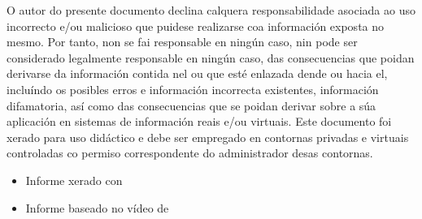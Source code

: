\documentclass[a4paper]{article}
\begin{document}
\begin{titlepage}
\begin{adjustbox}{width=0.9\paperwidth,center}
        \end{adjustbox}
        \vfill
        \vspace*{-0.4cm} 
        \begin{tcolorbox}[enhanced,attach boxed title to top center={yshift=-1mm,yshifttext=-1mm},
        colback=red!5!white,colframe=red!75!black,colbacktitle=red!90!black,
  title=LIMITACIÓN DE RESPONSABILIDADE,fonttitle=\bfseries,
  boxed title style={size=small,colframe=red!75!black} ]
               O autor do presente documento declina calquera responsabilidade asociada ao uso incorrecto e/ou malicioso que puidese realizarse coa información exposta no mesmo. Por tanto, non se fai responsable en ningún caso, nin pode ser considerado legalmente responsable en ningún caso, das consecuencias que poidan derivarse da información contida nel ou que esté enlazada dende ou hacia el, incluíndo os posibles erros e información incorrecta existentes, información difamatoria, así como das consecuencias que se poidan derivar sobre a súa aplicación en sistemas de información reais e/ou virtuais. Este documento foi xerado para uso didáctico e debe ser empregado en contornas privadas e virtuais controladas co permiso correspondente do administrador desas contornas.
        \end{tcolorbox}
        \begin{tcolorbox}[enhanced,attach boxed title to top center={yshift=-3mm,yshifttext=-1mm},
  colback=blue!5!white,colframe=blue!75!black,colbacktitle=green!80!black,
  title=De Interese,fonttitle=\bfseries,
  boxed title style={size=small,colframe=red!50!black} ]
  \centering
        \begin{itemize}[leftmargin=5.5mm]
        \item Informe xerado con \href{https://www.latex-project.org/}{\color{blue}{\LaTeX}}
        \item Informe baseado no vídeo de \href{https://youtu.be/riNRHoEOBeU}{\color{blue}{S4vitar: Cómo crear un reporte profesional en LaTeX}}

\end{itemize}
\end{tcolorbox}
\end{titlepage}
\end{document}
